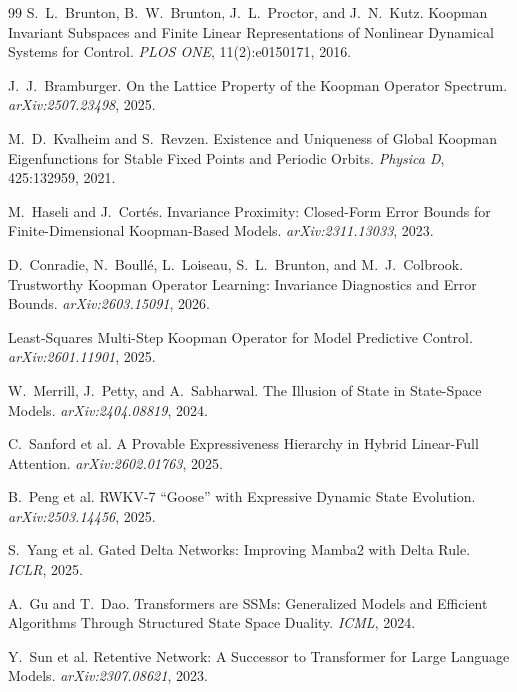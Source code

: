 \documentclass[11pt, a4paper]{article}
\theoremstyle{plain}
\theoremstyle{remark}
\begin{document}
\begin{thebibliography}{99}
S.~L.~Brunton, B.~W.~Brunton, J.~L.~Proctor, and J.~N.~Kutz.
\newblock Koopman Invariant Subspaces and Finite Linear Representations of Nonlinear Dynamical Systems for Control.
\newblock \emph{PLOS ONE}, 11(2):e0150171, 2016.

J.~J.~Bramburger.
\newblock On the Lattice Property of the Koopman Operator Spectrum.
\newblock \emph{arXiv:2507.23498}, 2025.

M.~D.~Kvalheim and S.~Revzen.
\newblock Existence and Uniqueness of Global Koopman Eigenfunctions for Stable Fixed Points and Periodic Orbits.
\newblock \emph{Physica D}, 425:132959, 2021.

M.~Haseli and J.~Cort\'{e}s.
\newblock Invariance Proximity: Closed-Form Error Bounds for Finite-Dimensional Koopman-Based Models.
\newblock \emph{arXiv:2311.13033}, 2023.

D.~Conradie, N.~Boull\'{e}, L.~Loiseau, S.~L.~Brunton, and M.~J.~Colbrook.
\newblock Trustworthy Koopman Operator Learning: Invariance Diagnostics and Error Bounds.
\newblock \emph{arXiv:2603.15091}, 2026.

Least-Squares Multi-Step Koopman Operator for Model Predictive Control.
\newblock \emph{arXiv:2601.11901}, 2025.

W.~Merrill, J.~Petty, and A.~Sabharwal.
\newblock The Illusion of State in State-Space Models.
\newblock \emph{arXiv:2404.08819}, 2024.

C.~Sanford et al.
\newblock A Provable Expressiveness Hierarchy in Hybrid Linear-Full Attention.
\newblock \emph{arXiv:2602.01763}, 2025.

B.~Peng et al.
\newblock RWKV-7 ``Goose'' with Expressive Dynamic State Evolution.
\newblock \emph{arXiv:2503.14456}, 2025.

S.~Yang et al.
\newblock Gated Delta Networks: Improving Mamba2 with Delta Rule.
\newblock \emph{ICLR}, 2025.

A.~Gu and T.~Dao.
\newblock Transformers are SSMs: Generalized Models and Efficient Algorithms Through Structured State Space Duality.
\newblock \emph{ICML}, 2024.

Y.~Sun et al.
\newblock Retentive Network: A Successor to Transformer for Large Language Models.
\newblock \emph{arXiv:2307.08621}, 2023.


\end{thebibliography}
\end{document}
